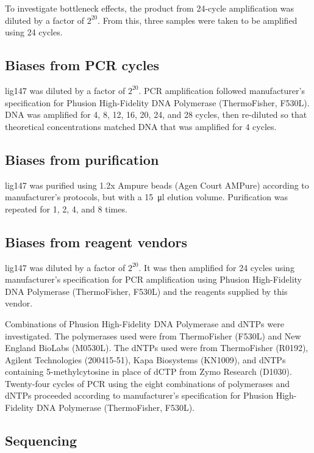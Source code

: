 \documentclass[parskip=full, numbers=noenddot]{scrreprt}
\begin{document}
To investigate bottleneck effects, the product from 24-cycle amplification was diluted by a factor of $2^{20}$.  From this, three samples were taken to be amplified using 24 cycles.

\subsection{Biases from PCR cycles}
\label{ssec:pcrbias_methods_pcr}

lig147 was diluted by a factor of $2^{20}$.  PCR amplification followed manufacturer's specification for Phusion High-Fidelity DNA Polymerase (ThermoFisher, F530L).  DNA was amplified for 4, 8, 12, 16, 20, 24, and 28 cycles, then re-diluted so that theoretical concentrations matched DNA that was amplified for 4 cycles.

\subsection{Biases from purification}
\label{ssec:pcrbias_methods_pur}

lig147 was purified using 1.2x Ampure beads (Agen Court AMPure) according to manufacturer's protocols, but with a \SI{15}{\micro\litre} elution volume.  Purification was repeated for 1, 2, 4, and 8 times.

\subsection{Biases from reagent vendors}
\label{ssec:pcrbias_methods_reagent}

lig147 was diluted by a factor of $2^{20}$.  It was then amplified for 24 cycles using manufacturer's specification for PCR amplification using Phusion High-Fidelity DNA Polymerase (ThermoFisher, F530L) and the reagents supplied by this vendor.

Combinations of Phusion High-Fidelity DNA Polymerase and dNTPs were investigated.  The polymerases used were from ThermoFisher (F530L) and New England BioLabs (M0530L).  The dNTPs used were from ThermoFisher (R0192), Agilent Technologies (200415-51), Kapa Biosystems (KN1009), and dNTPs containing 5-methylcytosine in place of dCTP from Zymo Research (D1030).  Twenty-four cycles of PCR using the eight combinations of polymerases and dNTPs proceeded according to manufacturer's specification for Phusion High-Fidelity DNA Polymerase (ThermoFisher, F530L).

\subsection{Sequencing}
\label{ssec:pcrbias_methods_seq}
\end{document}
